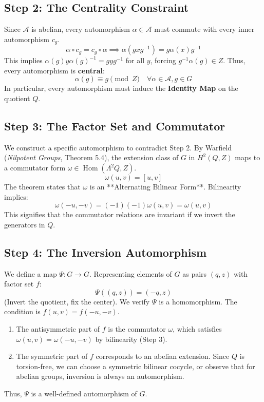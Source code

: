 \documentclass{book}
\begin{document}
\subsection*{Step 2: The Centrality Constraint}
Since $\mathcal{A}$ is abelian, every automorphism $\alpha \in \mathcal{A}$ must commute with every inner automorphism $c_g$.
\[ \alpha \circ c_g = c_g \circ \alpha \implies \alpha(gxg^{-1}) = g\alpha(x)g^{-1} \]
This implies $\alpha(g) y \alpha(g)^{-1} = g y g^{-1}$ for all $y$, forcing $g^{-1}\alpha(g) \in Z$.
Thus, every automorphism is \textbf{central}:
\[ \alpha(g) \equiv g \pmod{Z} \quad \forall \alpha \in \mathcal{A}, g \in G \]
In particular, every automorphism must induce the \textbf{Identity Map} on the quotient $Q$.

\subsection*{Step 3: The Factor Set and Commutator}
We construct a specific automorphism to contradict Step 2.
By Warfield (\textit{Nilpotent Groups}, Theorem 5.4), the extension class of $G$ in $H^2(Q, Z)$ maps to a commutator form $\omega \in \operatorname{Hom}(\Lambda^2 Q, Z)$.
\[ \omega(u, v) = [u, v] \]
The theorem states that $\omega$ is an **Alternating Bilinear Form**.
Bilinearity implies:
\[ \omega(-u, -v) = (-1)(-1)\omega(u, v) = \omega(u, v) \]
This signifies that the commutator relations are invariant if we invert the generators in $Q$.

\subsection*{Step 4: The Inversion Automorphism}
We define a map $\Psi: G \to G$. Representing elements of $G$ as pairs $(q, z)$ with factor set $f$:
\[ \Psi( (q, z) ) = (-q, z) \]
(Invert the quotient, fix the center).
We verify $\Psi$ is a homomorphism. The condition is $f(u, v) = f(-u, -v)$.
\begin{enumerate}
    \item The antisymmetric part of $f$ is the commutator $\omega$, which satisfies $\omega(u, v) = \omega(-u, -v)$ by bilinearity (Step 3).
    \item The symmetric part of $f$ corresponds to an abelian extension. Since $Q$ is torsion-free, we can choose a symmetric bilinear cocycle, or observe that for abelian groups, inversion is always an automorphism.
\end{enumerate}
Thus, $\Psi$ is a well-defined automorphism of $G$.
\end{document}
